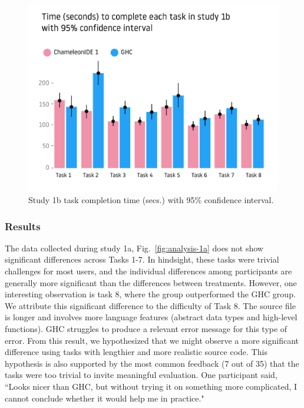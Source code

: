 \begin{figure}
    \centering
    \includegraphics[width=0.8\linewidth,trim=0mm 15mm 0mm 35mm,clip]{images/user-study-1b.pdf}
    \caption{Study 1b task completion time (secs.) with 95\% confidence interval.}
    \label{fig:analysis-1b}
\end{figure}

\subsubsection*{\textbf {Results}}

The data collected during study 1a, Fig.~\ref{fig:analysis-1a} does not show significant differences across Tasks 1-7. In hindsight, these tasks were trivial challenges for most users, and the individual differences among participants are generally more significant than the differences between treatments. However, one interesting observation is task 8, where the \chameleon{} group outperformed the GHC group. We attribute this significant difference to the difficulty of Task 8. The source file is longer and involves more language features (abstract data types and high-level functions). GHC struggles to produce a relevant error message for this type of error. 
From this result, we hypothesized that we might observe a more significant difference using tasks with lengthier and more realistic source code. 
This hypothesis is also supported by the most common feedback (7 out of 35) that the tasks were too trivial to invite meaningful evaluation. One participant said, ``Looks nicer than GHC, but without trying it on something more complicated, I cannot conclude whether it would help me in practice." 

